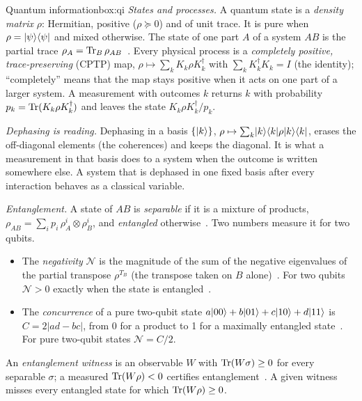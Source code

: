 \begin{primer}{Quantum information}{box:qi}
\setlength{\parskip}{3pt plus 1pt}%
\emph{States and processes.} A quantum state is a \emph{density matrix} $\rho$: Hermitian, positive ($\rho\succeq0$) and of unit trace.
It is pure when $\rho=\lvert \psi\rangle\langle \psi\rvert$ and mixed otherwise. The state of one part $A$ of a system $AB$ is the partial trace
$\rho_A=\operatorname{Tr}_B\rho_{AB}$~\cite{nielsen2010}. Every physical process is a \emph{completely positive, trace-preserving} (CPTP) map,
$\rho\mapsto\sum_kK_k\rho K_k^\dagger$ with $\sum_kK_k^\dagger K_k=I$ (the identity); ``completely'' means that the map stays positive when it
acts on one part of a larger system. A measurement with outcomes $k$ returns $k$ with probability $p_k=\operatorname{Tr}(K_k\rho K_k^\dagger)$ and leaves
the state $K_k\rho K_k^\dagger/p_k$.

\emph{Dephasing is reading.} Dephasing in a basis $\{\lvert k\rangle\}$, $\rho\mapsto\sum_k\lvert k\rangle\langle k\rvert\rho\lvert k\rangle\langle k\rvert$, erases the off-diagonal
elements (the coherences) and keeps the diagonal. It is what a measurement in that basis does to a system when the outcome is written
somewhere else. A system that is dephased in one fixed basis after every interaction behaves as a classical variable.

\emph{Entanglement.} A state of $AB$ is \emph{separable} if it is a mixture of products, $\rho_{AB}=\sum_ip_i\,\rho_A^i\otimes\rho_B^i$,
and \emph{entangled} otherwise~\cite{horodecki2009}. Two numbers measure it for two qubits.
\begin{itemize}[nosep,leftmargin=*]
\item The \emph{negativity} $\mathcal N$ is the magnitude of the sum of the negative eigenvalues of the partial transpose $\rho^{T_B}$
(the transpose taken on $B$ alone)~\cite{vw}. For two qubits $\mathcal N>0$ exactly when the state is entangled~\cite{peres1996,horodecki1996}.
\item The \emph{concurrence} of a pure two-qubit state $a\lvert 00\rangle+b\lvert 01\rangle+c\lvert 10\rangle+d\lvert 11\rangle$ is $C=2|ad-bc|$, from 0 for a product to 1
for a maximally entangled state~\cite{wootters1998}. For pure two-qubit states $\mathcal N=C/2$.
\end{itemize}
An \emph{entanglement witness} is an observable $W$ with $\operatorname{Tr}(W\sigma)\ge0$ for every separable $\sigma$; a measured $\operatorname{Tr}(W\rho)<0$
certifies entanglement~\cite{guhne2009}. A given witness misses every entangled state for which $\operatorname{Tr}(W\rho)\ge0$.


\end{primer}

